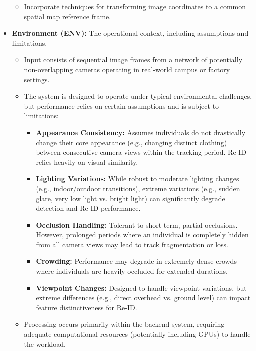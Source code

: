 \begin{itemize}
\begin{itemize}
            \item Incorporate techniques for transforming image coordinates to a common spatial map reference frame.
        \end{itemize}
    \item \textbf{Environment (ENV):} The operational context, including assumptions and limitations.
        \begin{itemize}
            \item Input consists of sequential image frames from a network of potentially non-overlapping cameras operating in real-world campus or factory settings.
            \item The system is designed to operate under typical environmental challenges, but performance relies on certain assumptions and is subject to limitations:
                \begin{itemize}
                    \item \textbf{Appearance Consistency:} Assumes individuals do not drastically change their core appearance (e.g., changing distinct clothing) between consecutive camera views within the tracking period. Re-ID relies heavily on visual similarity.
                    \item \textbf{Lighting Variations:} While robust to moderate lighting changes (e.g., indoor/outdoor transitions), extreme variations (e.g., sudden glare, very low light vs. bright light) can significantly degrade detection and Re-ID performance.
                    \item \textbf{Occlusion Handling:} Tolerant to short-term, partial occlusions. However, prolonged periods where an individual is completely hidden from all camera views may lead to track fragmentation or loss.
                    \item \textbf{Crowding:} Performance may degrade in extremely dense crowds where individuals are heavily occluded for extended durations.
                    \item \textbf{Viewpoint Changes:} Designed to handle viewpoint variations, but extreme differences (e.g., direct overhead vs. ground level) can impact feature distinctiveness for Re-ID.
                \end{itemize}
            \item Processing occurs primarily within the backend system, requiring adequate computational resources (potentially including GPUs) to handle the workload.
        \end{itemize}
\end{itemize}

